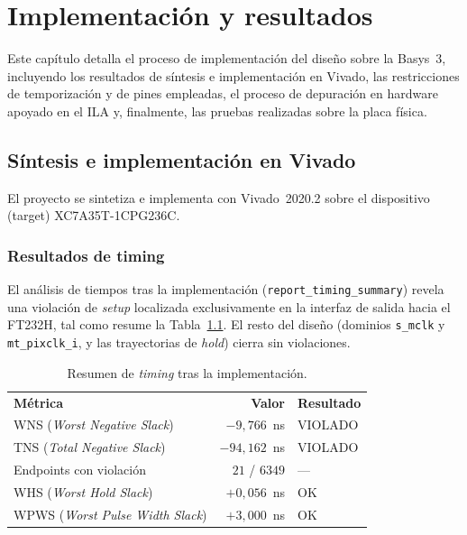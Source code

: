 \documentclass[../main.tex]{subfiles}
\begin{document}
\chapter{Implementación y resultados}
\label{chap:implementacion}

Este capítulo detalla el proceso de implementación del diseño sobre la Basys~3, incluyendo los resultados de síntesis e implementación en Vivado, las restricciones de temporización y de pines empleadas, el proceso de depuración en hardware apoyado en el \ac{ILA} y, finalmente, las pruebas realizadas sobre la placa física.
\section{Síntesis e implementación en Vivado}

El proyecto se sintetiza e implementa con Vivado~2020.2 sobre el dispositivo (target) XC7A35T-1CPG236C. 

\subsection{Resultados de timing}
\label{sec:resultados_timing}

El análisis de tiempos tras la implementación (\texttt{report\_timing\_summary}) revela una violación de \textit{setup} localizada exclusivamente en la interfaz de salida hacia el FT232H, tal como resume la Tabla~\ref{tab:timing}. El resto del diseño (dominios \texttt{s\_mclk} y \texttt{mt\_pixclk\_i}, y las trayectorias de \textit{hold}) cierra sin violaciones.

\begin{table}[H]
\centering
\caption{Resumen de \textit{timing} tras la implementación.}
\label{tab:timing}
\begin{tabular}{lrl}
\rowcolor[HTML]{156082}
{\color{white}\textbf{Métrica}} & {\color{white}\textbf{Valor}} & {\color{white}\textbf{Resultado}} \\
\rowcolor[HTML]{C0E6F5}
WNS (\textit{Worst Negative Slack}) & $-9{,}766$~ns & VIOLADO \\
TNS (\textit{Total Negative Slack}) & $-94{,}162$~ns & VIOLADO \\
\rowcolor[HTML]{C0E6F5}
Endpoints con violación & $21$ / $6349$ & --- \\
WHS (\textit{Worst Hold Slack}) & $+0{,}056$~ns & OK \\
\rowcolor[HTML]{C0E6F5}
WPWS (\textit{Worst Pulse Width Slack}) & $+3{,}000$~ns & OK \\
\end{tabular}
\end{table}
\end{document}
